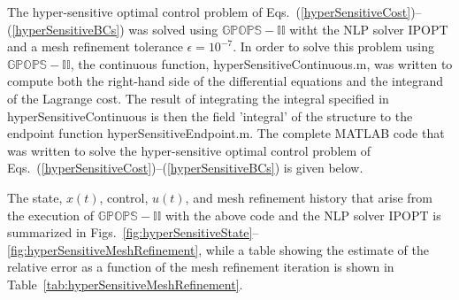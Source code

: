 \documentclass[10pt]{article}
\newenvironment{shadedframe}{%
  \def\FrameCommand{\fcolorbox{black}{shadecolor}}%
  \MakeFramed {\FrameRestore}}
{\endMakeFramed}
\newcommand{\slred}[1]{\textrm{\color{red}{\sl #1}}}
\begin{document}
The hyper-sensitive optimal control problem of
Eqs.~(\ref{hyperSensitiveCost})--(\ref{hyperSensitiveBCs}) was solved
using $\mathbb{GPOPS-II}$ witht the NLP solver IPOPT and a mesh
refinement tolerance $\epsilon=10^{-7}$.  In order to solve this
problem using $\mathbb{GPOPS-II}$, the continuous function,
hyperSensitiveContinuous.m, was written to compute both the right-hand
side of the differential equations and the integrand of the Lagrange
cost.  The result of integrating the integral specified in
hyperSensitiveContinuous is then the field 'integral' of the structure
\slred{input} to the endpoint function hyperSensitiveEndpoint.m.  The
complete MATLAB code that was written to solve the hyper-sensitive
optimal control problem of
Eqs.~(\ref{hyperSensitiveCost})--(\ref{hyperSensitiveBCs}) is given
below.  
\begin{shadedframe}



\end{shadedframe}
The state, $x(t)$, control, $u(t)$, and mesh refinement history that
arise from the execution of $\mathbb{GPOPS-II}$ with the above code and the NLP
solver IPOPT is summarized in
Figs.~\ref{fig:hyperSensitiveState}--\ref{fig:hyperSensitiveMeshRefinement},
while a table showing the estimate of the relative error as a function
of the mesh refinement iteration is shown in Table~\ref{tab:hyperSensitiveMeshRefinement}.
\end{document}

